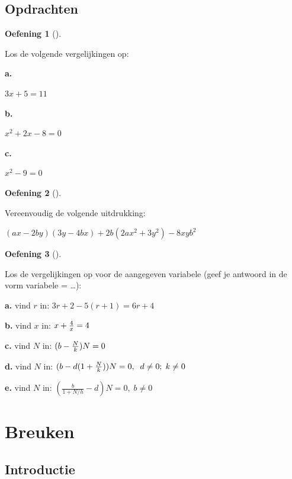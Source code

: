\documentclass[
  a4paper,
]{scrbook}
\theoremstyle{definition}
\newtheorem{exercise}{Oefening}[chapter]
\theoremstyle{remark}
\begin{document}
\hypertarget{opdrachten}{%
\section{Opdrachten}\label{opdrachten}}

\begin{exercise}[]\protect\hypertarget{exr-algebra-1}{}\label{exr-algebra-1}

Los de volgende vergelijkingen op:

\textbf{a.}

\(3x + 5 = 11\)

\textbf{b.}

\(x^2 + 2x - 8 = 0\)

\textbf{c.}

\(x^2 - 9 = 0\)

\end{exercise}

\begin{exercise}[]\protect\hypertarget{exr-algebra-2}{}\label{exr-algebra-2}

Vereenvoudig de volgende uitdrukking:

\((ax-2by)(3y-4bx)+2b(2ax^2+3y^2)-8xyb^2\)

\end{exercise}

\begin{exercise}[]\protect\hypertarget{exr-algebra-3}{}\label{exr-algebra-3}

Los de vergelijkingen op voor de aangegeven variabele (geef je antwoord
in de vorm variabele = \ldots):

\textbf{a.} vind \(r\) in: \(3r + 2 - 5(r+1) = 6r+4\)

\textbf{b.} vind \(x\) in: \(x + {4 \over x} =4\)

\textbf{c.} vind \(N\) in: \((b-{N \over k})N=0\)

\textbf{d.} vind \(N\) in:
\((b-d(1+{N \over k}))N=0,\;\;d \ne 0;\;k \ne 0\)

\textbf{e.} vind \(N\) in: \((\frac{b}{1+N/h}-d)N=0, \;b \ne 0\)

\end{exercise}

\hypertarget{sec-breuken}{%
\chapter{Breuken}\label{sec-breuken}}

\hypertarget{introductie-1}{%
\section{Introductie}\label{introductie-1}}
\end{document}
